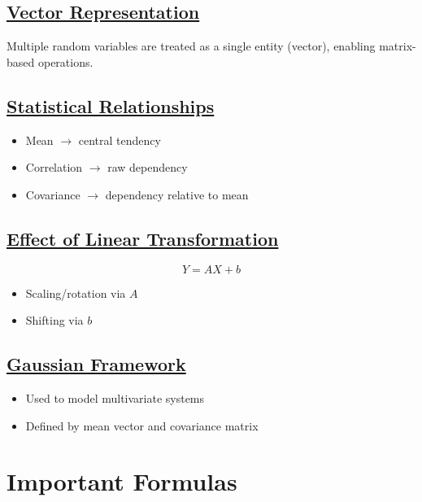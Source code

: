 \documentclass[11pt]{article}
\begin{document}
\vspace{0.5cm}
\subsection*{\underline{Vector Representation}}
Multiple random variables are treated as a single entity (vector), enabling matrix-based operations.

\vspace{0.5cm}
\subsection*{\underline{Statistical Relationships}}
\begin{itemize}
    \item Mean $\rightarrow$ central tendency
    \item Correlation $\rightarrow$ raw dependency
    \item Covariance $\rightarrow$ dependency relative to mean
\end{itemize}

\vspace{0.5cm}
\subsection*{\underline{Effect of Linear Transformation}}
\[
Y = AX + b
\]
\begin{itemize}
    \item Scaling/rotation via $A$
    \item Shifting via $b$
\end{itemize}

\vspace{0.5cm}
\subsection*{\underline{Gaussian Framework}}
\begin{itemize}
    \item Used to model multivariate systems
    \item Defined by mean vector and covariance matrix
\end{itemize}

\vspace{1cm}
\section{Important Formulas}

\vspace{0.5cm}
\end{document}
